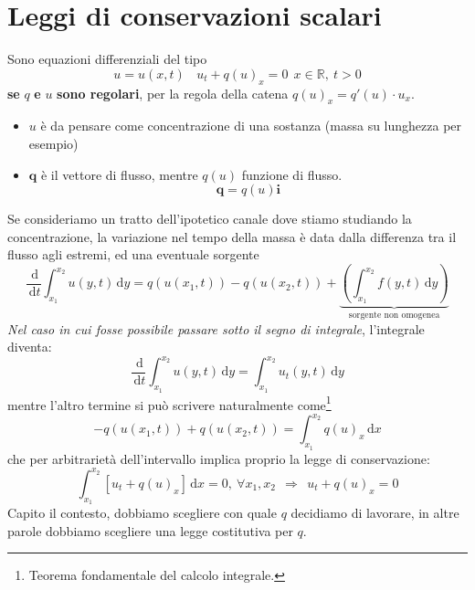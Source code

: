 \documentclass[10pt,a4paper,twoside,openright]{book}
\newcommand{\de}{\,\mathrm d}
\newcommand{\dx}{\de x}
\newcommand{\dy}{\de y}
\newcommand{\dt}{\de t}
\begin{document}
\chapter{Leggi di conservazioni scalari}

Sono equazioni differenziali del tipo
\begin{equation}
	u=u(x,t) \ \ \ \ \boxed{u_{t} +q(u)_{x} =0}\ \ x\in \mathbb{R} ,\ t >0
\end{equation}
\textbf{se }$q$\textbf{ e }$u$\textbf{ sono regolari}, per la regola della catena $q(u)_{x} =q'(u) \cdotp u_{x}$.
\begin{itemize}
	\item $u$ è da pensare come concentrazione di una sostanza (massa su lunghezza per esempio)
	\item $\mathbf{q}$ è il vettore di flusso, mentre $q(u)$ funzione di flusso.
	      \begin{equation}
	      	\mathbf{q} =q(u)\mathbf{i}
	      \end{equation}
\end{itemize}

Se consideriamo un tratto dell'ipotetico canale dove stiamo studiando la concentrazione, la variazione nel tempo della massa è data dalla differenza tra il flusso agli estremi, ed una eventuale sorgente
\begin{equation*}
	\frac{\de}{\dt}\int ^{x_{2}}_{x_{1}} u(y,t) \dy=q(u(x_{1} ,t)) -q(u(x_{2} ,t)) +\underbrace{\left(\int ^{x_{2}}_{x_{1}} f(y,t) \dy\right)}_{\text{sorgente non omogenea}}
\end{equation*}
\emph{Nel caso in cui fosse possibile passare sotto il segno di integrale}, l'integrale diventa:
\begin{equation}
	\frac{\de}{\dt}\int ^{x_{2}}_{x_{1}} u(y,t) \dy=\int ^{x_{2}}_{x_{1}} u_{t}(y,t) \dy
	\label{eq:lc-passaggio-derivata-integrale}
\end{equation}
mentre l'altro termine si può scrivere naturalmente come\footnote{Teorema fondamentale del calcolo integrale.}
\begin{equation*}
	-q(u(x_{1} ,t)) +q(u(x_{2} ,t)) =\int ^{x_{2}}_{x_{1}} q(u)_{x} \dx
\end{equation*}
che per arbitrarietà dell'intervallo implica proprio la legge di conservazione:
\begin{equation*}
	\int ^{x_{2}}_{x_{1}}[ u_{t} +q(u)_{x}] \dx=0,\ \forall x_{1} ,x_{2} \ \ \Rightarrow \ \ u_{t} +q(u)_{x} =0
\end{equation*}
Capito il contesto, dobbiamo scegliere con quale $q$ decidiamo di lavorare, in altre parole dobbiamo scegliere una legge costitutiva per $q$.
\end{document}
